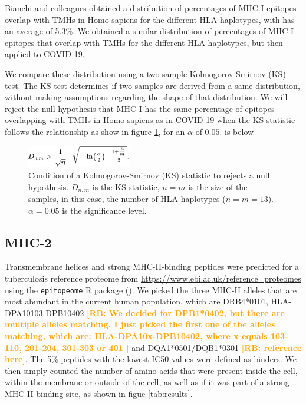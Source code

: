 \documentclass{article}
\newcommand{\richel}[1]{\textcolor{orange}{\textbf{[RB: #1]}}}
\begin{document}
Bianchi and colleagues obtained a distribution of 
percentages of MHC-I epitopes overlap with TMHs in Homo sapiens
for the different HLA haplotypes, with has an average of 5.3\%.
We obtained a similar distribution of percentages of MHC-I epitopes that 
overlap with TMHs for the different HLA haplotypes, but then applied to
COVID-19.

We compare these distribution using a two-sample 
Kolmogorov-Smirnov (KS) test. The KS test determines if two samples
are derived from a same distribution, without making assumptions
regarding the shape of that distribution. We will reject
the null hypothesis that MHC-I has the same percentage of epitopes 
overlapping with TMHs in Homo sapiens as in COVID-19 when 
the KS statistic follows the relationship as show in 
figure \ref{fig:ks}, for an $\alpha$ of $0.05$.
is below 

\begin{figure}[!htbp]
  \includegraphics[width=0.4\textwidth]{pics/ks.png}
  \caption{
    Condition of a Kolmogorov-Smirnov (KS) statistic to rejects a null
    hypothesis. $D_{n,m}$ is the KS statistic, $n = m$ is the size
    of the samples, in this case, the number of HLA haplotypes ($n = m = 13$).
    $\alpha = 0.05$ is the significance level.
  }
  \label{fig:ks}
\end{figure}

\subsection{MHC-2}

\iffalse
	Transmembrane helices and strong MHC-II-binding peptides
	were predicted for a tuberculosis reference proteome 
	from \url{https://www.ebi.ac.uk/reference_proteomes}
	using the \verb;epitopeome; R package (\cite{epitopeome}).
	We picked the three MHC-II alleles that are most abundant 
	in the current human population, 
	which are DRB4*0101, HLA-DPA10103-DPB10402 
	\richel{
	  We decided for DPB1*0402, but there are multiple alleles matching.
	  I just picked the first one of the alleles matching, which are:
	  HLA-DPA10x-DPB10402, where x equals 103-110, 201-204, 301-303 or 401
	}
	and DQA1*0501/DQB1*0301 \richel{reference here}.
	The 5\% peptides with the lowest IC50 values were defined as binders.
	We then simply counted the number of amino acids that were present inside the
	cell, within the membrane or outside of the cell, as well as if it was part 
	of a strong MHC-II binding site, as shown in figue \ref{tab:results}.
\end{document}
